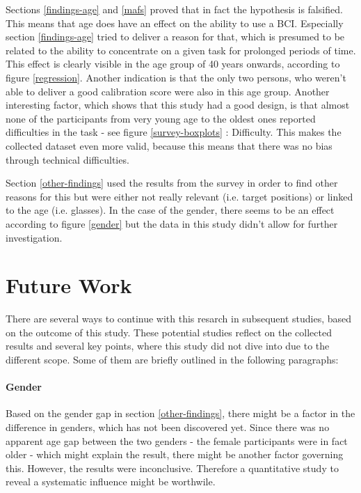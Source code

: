             Sections \ref{findings-age} and \ref{mafs} proved that in fact the hypothesis is falsified. This means that age does have an effect on the ability to use a BCI. Especially section \ref{findings-age} tried to deliver a reason for that, which is presumed to be related to the ability to concentrate on a given task for prolonged periods of time. This effect is clearly visible in the age group of 40 years onwards, according to figure \ref{regression}. Another indication is that the only two persons, who weren't able to deliver a good calibration score were also in this age group. Another interesting factor, which shows that this study had a good design, is that almost none of the participants from very young age to the oldest ones reported difficulties in the task - see figure \ref*{survey-boxplots} : Difficulty. This makes the collected dataset even more valid, because this means that there was no bias through technical difficulties.
            
            Section \ref{other-findings} used the results from the survey in order to find other reasons for this but were either not really relevant (i.e. target positions) or linked to the age (i.e. glasses). In the case of the gender, there seems to be an effect according to figure \ref{gender} but the data in this study didn't allow for further investigation.

        \section{Future Work}

            There are several ways to continue with this resarch in subsequent studies, based on the outcome of this study. These potential studies reflect on the collected results and several key points, where this study did not dive into due to the different scope. Some of them are briefly outlined in the following paragraphs:

            \paragraph{Gender} Based on the gender gap in section \ref*{other-findings}, there might be a factor in the difference in genders, which has not been discovered yet. Since there was no apparent age gap between the two genders - the female participants were in fact older - which might explain the result, there might be another factor governing this. However, the results were inconclusive. Therefore a quantitative study to reveal a systematic influence might be worthwile. 


